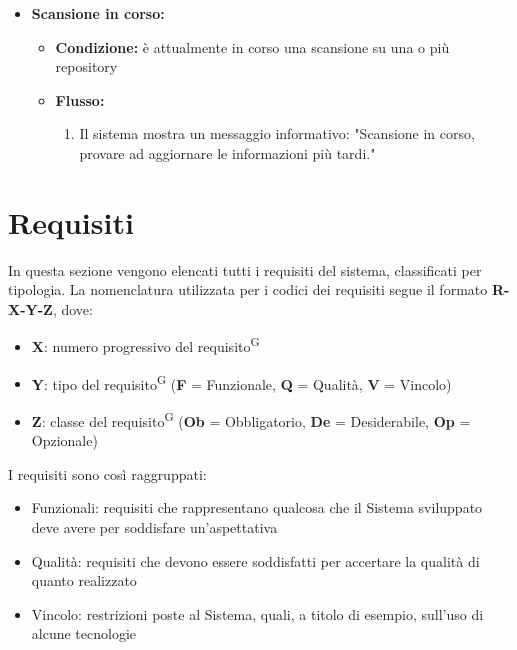 \documentclass[a4paper, 11pt]{article}
\begin{document}
\begin{itemize}
\begin{itemize}
\begin{itemize}
\begin{enumerate}
				\end{enumerate}
			\end{itemize}
		\item \textbf{Scansione in corso:} 
			\begin{itemize}
				\item \textbf{Condizione:} è attualmente in corso una scansione su una o più repository
				\item \textbf{Flusso:} 
				\begin{enumerate}
					\item Il sistema mostra un messaggio informativo: "Scansione in corso, provare ad aggiornare le informazioni più tardi." 
				\end{enumerate}
			\end{itemize}
	\end{itemize}
\end{itemize}






\newpage
\section{Requisiti} \label{sec:requisiti}

In questa sezione vengono elencati tutti i requisiti del sistema, classificati per tipologia.
La nomenclatura utilizzata per i codici dei requisiti segue il formato \textbf{R-X-Y-Z}, dove:
\begin{itemize}
    \item \textbf{X}: numero progressivo del requisito\textsuperscript{G}
    \item \textbf{Y}: tipo del requisito\textsuperscript{G} (\textbf{F} = Funzionale, \textbf{Q} = Qualità, \textbf{V} = Vincolo)
    \item \textbf{Z}: classe del requisito\textsuperscript{G} (\textbf{Ob} = Obbligatorio, \textbf{De} = Desiderabile, \textbf{Op} = Opzionale)
\end{itemize}

I requisiti sono così raggruppati: 
\begin{itemize}
    \item Funzionali: requisiti che rappresentano qualcosa che il Sistema sviluppato deve
avere per soddisfare un’aspettativa
    \item Qualità: requisiti che devono essere soddisfatti per accertare la qualità di
quanto realizzato
    \item Vincolo: restrizioni poste al Sistema, quali, a titolo di esempio, sull’uso di alcune
tecnologie
\end{itemize}
\end{document}
